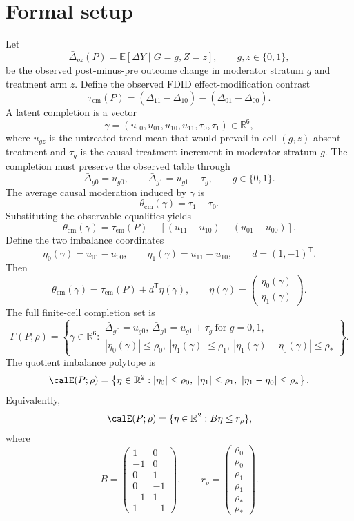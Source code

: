 \documentclass[11pt]{article}
\newcommand{\E}{\mathbb{E}}
\newcommand{\transpose}{\mathsf{T}}
\newcommand{\R}{\mathbb{R}}
\theoremstyle{definition}
\theoremstyle{plain}
\theoremstyle{remark}
\begin{document}
\section{Formal setup}
Let
\[
\bar\Delta_{gz}(P)=\E[\Delta Y\mid G=g,Z=z],
\qquad g,z\in\{0,1\},
\]
be the observed post-minus-pre outcome change in moderator stratum \(g\) and treatment arm \(z\). Define the observed FDID effect-modification contrast
\[
\tau_{\mathrm{em}}(P)=
(\bar\Delta_{11}-\bar\Delta_{10})-(\bar\Delta_{01}-\bar\Delta_{00}).
\]
A latent completion is a vector
\[
\gamma=(u_{00},u_{01},u_{10},u_{11},\tau_0,\tau_1)\in\R^6,
\]
where \(u_{gz}\) is the untreated-trend mean that would prevail in cell \((g,z)\) absent treatment and \(\tau_g\) is the causal treatment increment in moderator stratum \(g\). The completion must preserve the observed table through
\[
\bar\Delta_{g0}=u_{g0},
\qquad
\bar\Delta_{g1}=u_{g1}+\tau_g,
\qquad g\in\{0,1\}.
\]
The average causal moderation induced by \(\gamma\) is
\[
\theta_{\mathrm{cm}}(\gamma)=\tau_1-\tau_0.
\]
Substituting the observable equalities yields
\[
\theta_{\mathrm{cm}}(\gamma)=
\tau_{\mathrm{em}}(P)-[(u_{11}-u_{10})-(u_{01}-u_{00})].
\]
Define the two imbalance coordinates
\[
\eta_0(\gamma)=u_{01}-u_{00},
\qquad
\eta_1(\gamma)=u_{11}-u_{10},
\qquad
d=(1,-1)^\transpose.
\]
Then
\[
\theta_{\mathrm{cm}}(\gamma)=\tau_{\mathrm{em}}(P)+d^\transpose \eta(\gamma),
\qquad
\eta(\gamma)=
\begin{pmatrix}
\eta_0(\gamma)\\
\eta_1(\gamma)
\end{pmatrix}.
\]
The full finite-cell completion set is
\[
\Gamma(P;\rho)=
\left\{\gamma\in\R^6:
\begin{array}{l}
\bar\Delta_{g0}=u_{g0},\ \bar\Delta_{g1}=u_{g1}+\tau_g\ \text{for }g=0,1,\\
|\eta_0(\gamma)|\le \rho_0,\ |\eta_1(\gamma)|\le \rho_1,\ |\eta_1(\gamma)-\eta_0(\gamma)|\le \rho_\ast
\end{array}
\right\}.
\]
The quotient imbalance polytope is
\[
\calE(P;\rho)=
\left\{\eta\in\R^2:
|\eta_0|\le \rho_0,\ |\eta_1|\le \rho_1,\ |\eta_1-\eta_0|\le \rho_\ast
\right\}.
\]
Equivalently,
\[
\calE(P;\rho)=\{\eta\in\R^2:B\eta\le r_\rho\},
\]
where
\[
B=
\begin{pmatrix}
1 & 0\\
-1 & 0\\
0 & 1\\
0 & -1\\
-1 & 1\\
1 & -1
\end{pmatrix},
\qquad
r_\rho=
\begin{pmatrix}
\rho_0\\ \rho_0\\ \rho_1\\ \rho_1\\ \rho_\ast\\ \rho_\ast
\end{pmatrix}.
\]
\end{document}

